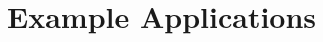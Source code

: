 \documentclass[letterpaper,10pt,english]{sphinxmanual}
\begin{document}
\begin{DUlineblock}{0em}
\item[] 
\item[] 
\end{DUlineblock}

{\hfill{}\hfill}

\begin{DUlineblock}{0em}
\item[] 
\item[] 
\end{DUlineblock}

{\hfill{}\hfill}

\begin{DUlineblock}{0em}
\item[] 
\item[] 
\end{DUlineblock}


\chapter{Example Applications}
\label{applications:applications-chapter}\label{applications::doc}\label{applications:example-applications}
\end{document}
